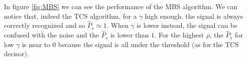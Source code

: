 \documentclass[%
    twoside, 
    a4paper
    ]{article}
\begin{document}
    In figure \ref{fig:MBS} we can see the performance of the MBS algorithm. We can notice that, indeed the TCS
    algorithm, for a $\gamma$ high enough, the signal is always correctly recognized and so $\hat{P}_s \simeq 1$. When 
    $\gamma$ is lower instead, the signal can be confused with the noise and the $\hat{P}_s$ is lower than $1$.
    For the highest $\rho$, the $\hat{P}_s$ for low $\gamma$ is near to $0$ because the signal is all under the 
    threshold (as for the TCS decisor).
     

\newpage


\end{document}
